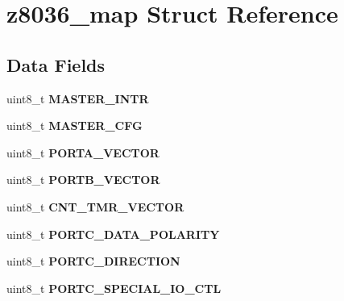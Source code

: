 \hypertarget{structz8036__map}{}\section{z8036\+\_\+map Struct Reference}
\label{structz8036__map}
\subsection*{Data Fields}
\begin{DoxyCompactItemize}
\item 
\mbox{\label{structz8036__map_ae016c49c42fede1d76423cb91109f124}} 
uint8\+\_\+t {\bfseries M\+A\+S\+T\+E\+R\+\_\+\+I\+N\+TR}
\item 
\mbox{\label{structz8036__map_a03a2e4f955c18d91dc9fe716e97ba55c}} 
uint8\+\_\+t {\bfseries M\+A\+S\+T\+E\+R\+\_\+\+C\+FG}
\item 
\mbox{\label{structz8036__map_a546fe327f8a0ab2937d3d90b7bf2bf72}} 
uint8\+\_\+t {\bfseries P\+O\+R\+T\+A\+\_\+\+V\+E\+C\+T\+OR}
\item 
\mbox{\label{structz8036__map_a5eb971c0c8865fce3d75405316c683dc}} 
uint8\+\_\+t {\bfseries P\+O\+R\+T\+B\+\_\+\+V\+E\+C\+T\+OR}
\item 
\mbox{\label{structz8036__map_abf086535a657d7b3113ef38f3999316d}} 
uint8\+\_\+t {\bfseries C\+N\+T\+\_\+\+T\+M\+R\+\_\+\+V\+E\+C\+T\+OR}
\item 
\mbox{\label{structz8036__map_ae22b2f73eae78aa33c34db96a5406ecd}} 
uint8\+\_\+t {\bfseries P\+O\+R\+T\+C\+\_\+\+D\+A\+T\+A\+\_\+\+P\+O\+L\+A\+R\+I\+TY}
\item 
\mbox{\label{structz8036__map_a25b5e35b89cb582f6a9623a97c95190e}} 
uint8\+\_\+t {\bfseries P\+O\+R\+T\+C\+\_\+\+D\+I\+R\+E\+C\+T\+I\+ON}
\item 
\mbox{\label{structz8036__map_abb5eff8db175c2c88669907dbf0bd20e}} 
uint8\+\_\+t {\bfseries P\+O\+R\+T\+C\+\_\+\+S\+P\+E\+C\+I\+A\+L\+\_\+\+I\+O\+\_\+\+C\+TL}
\item 
\mbox{\label{structz8036__map_a2eeeddf104eb6f0292cfb9f47cb70b75}} 

\end{DoxyCompactItemize}
